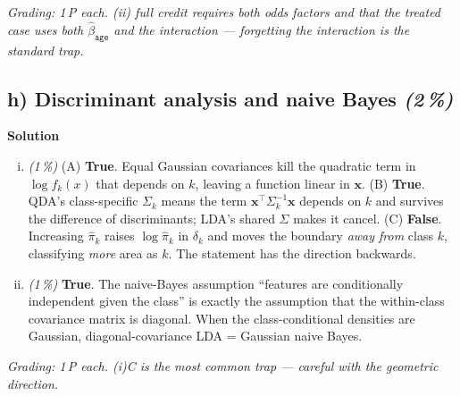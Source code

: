 \documentclass[11pt,a4paper]{article}
\newcommand{\subpoints}[1]{\textit{(#1\,\%)}}
\newcommand{\sol}{\noindent\textbf{Solution}}
\begin{document}
\noindent\emph{Grading: 1\,P each. (ii) full credit requires both odds factors and that the treated
case uses both $\hat\beta_{\texttt{age}}$ and the interaction --- forgetting the interaction is the
standard trap.}

\subsection*{h) Discriminant analysis and naive Bayes \subpoints{2}}
\sol{}
\begin{enumerate}[(i)]
  \item \subpoints{1} (A) \textbf{True}. Equal Gaussian covariances kill the quadratic term in
        $\log f_k(x)$ that depends on $k$, leaving a function linear in $\mathbf x$.
        (B) \textbf{True}. QDA's class-specific $\Sigma_k$ means the term $\mathbf x^\top\Sigma_k^{-1}\mathbf x$
        depends on $k$ and survives the difference of discriminants; LDA's shared $\Sigma$ makes it
        cancel. (C) \textbf{False}. Increasing $\hat\pi_k$ raises $\log\hat\pi_k$ in $\delta_k$ and
        moves the boundary \emph{away from} class $k$, classifying \emph{more} area as $k$. The
        statement has the direction backwards.
  \item \subpoints{1} \textbf{True}. The naive-Bayes assumption ``features are conditionally
        independent given the class'' is exactly the assumption that the within-class covariance
        matrix is diagonal. When the class-conditional densities are Gaussian, diagonal-covariance
        LDA = Gaussian naive Bayes.
\end{enumerate}

\noindent\emph{Grading: 1\,P each. (i)C is the most common trap --- careful with the geometric
direction.}
\end{document}
